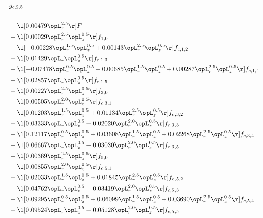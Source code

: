 \begin{alignat}{2} 
\label{eq:g_25_0} 
& g_{c,2,5} \nonumber \\ 
 = \\ 
& - \l[  0.00479 \opL_r^{2.5}  \r] F \nonumber \\ 
& + \l[  0.00029 \opL_r^{2.5} \opL_z^{0.5}  \r] f_{1,0} \nonumber \\ 
& + \l[  -0.00228 \opL_r^{1.5} \opL_z^{0.5} +  0.00143 \opL_r^{2.5} \opL_z^{0.5}  \r] f_{c,1,2} \nonumber \\ 
& + \l[  0.01429 \opL_r \opL_z^{0.5}  \r] f_{c,1,3} \nonumber \\ 
& + \l[  -0.07478 \opL_r^{0.5} \opL_z^{0.5}   -0.00685 \opL_r^{1.5} \opL_z^{0.5} +  0.00287 \opL_r^{2.5} \opL_z^{0.5}  \r] f_{c,1,4} \nonumber \\ 
& + \l[  0.02857 \opL_r \opL_z^{0.5}  \r] f_{c,1,5} \nonumber \\ 
& - \l[  0.00227 \opL_r^{2.5} \opL_z^{0.5}  \r] f_{3,0} \nonumber \\ 
& + \l[  0.00505 \opL_r^{2.0} \opL_z^{0.5}  \r] f_{c,3,1} \nonumber \\ 
& - \l[  0.01203 \opL_r^{1.5} \opL_z^{0.5} +  0.01134 \opL_r^{2.5} \opL_z^{0.5}  \r] f_{c,3,2} \nonumber \\ 
& + \l[  0.03333 \opL_r \opL_z^{0.5} +  0.02020 \opL_r^{2.0} \opL_z^{0.5}  \r] f_{c,3,3} \nonumber \\ 
& - \l[  0.12117 \opL_r^{0.5} \opL_z^{0.5} +  0.03608 \opL_r^{1.5} \opL_z^{0.5} +  0.02268 \opL_r^{2.5} \opL_z^{0.5}  \r] f_{c,3,4} \nonumber \\ 
& + \l[  0.06667 \opL_r \opL_z^{0.5} +  0.03030 \opL_r^{2.0} \opL_z^{0.5}  \r] f_{c,3,5} \nonumber \\ 
& + \l[  0.00369 \opL_r^{2.5} \opL_z^{0.5}  \r] f_{5,0} \nonumber \\ 
& - \l[  0.00855 \opL_r^{2.0} \opL_z^{0.5}  \r] f_{c,5,1} \nonumber \\ 
& + \l[  0.02033 \opL_r^{1.5} \opL_z^{0.5} +  0.01845 \opL_r^{2.5} \opL_z^{0.5}  \r] f_{c,5,2} \nonumber \\ 
& - \l[  0.04762 \opL_r \opL_z^{0.5} +  0.03419 \opL_r^{2.0} \opL_z^{0.5}  \r] f_{c,5,3} \nonumber \\ 
& + \l[  0.09295 \opL_r^{0.5} \opL_z^{0.5} +  0.06099 \opL_r^{1.5} \opL_z^{0.5} +  0.03690 \opL_r^{2.5} \opL_z^{0.5}  \r] f_{c,5,4} \nonumber \\ 
& - \l[  0.09524 \opL_r \opL_z^{0.5} +  0.05128 \opL_r^{2.0} \opL_z^{0.5}  \r] f_{c,5,5} \nonumber \\ 
\end{alignat} 


